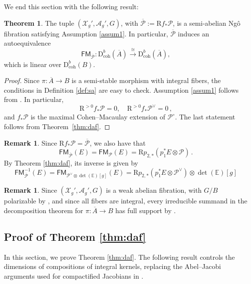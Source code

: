\documentclass[11pt]{article}
\def\P{\mathcal{P}}
\def\dbcoh{\mathrm{D}^b_{\mathrm{coh}}}
\def\Pbar{\overline{\mathcal{P}}}
\def\FM{\mathsf{FM}}
\newcommand{\barA}{\overline{A}}
\theoremstyle{definition}
\newtheorem{theorem}[definition]{Theorem}
\newtheorem{remark}[definition]{Remark}
\begin{document}
We end this section with the following result:

\begin{theorem}\label{thm:deq}
    The tuple $(\mathcal{X}_g',\mathcal{A}_g',G)$, with
    $\Pbar := \mathrm{R}f_*\P$, is a semi-abelian Ng\^o fibration satisfying Assumption
    \ref{assum1}. In particular, $\Pbar$ induces an autoequivalence
    \[
    \FM_{\Pbar} : \dbcoh(\barA) \xrightarrow{\cong} \dbcoh(\barA),
    \]
    which is linear over $\dbcoh(B)$.
\end{theorem}

\begin{proof}
    Since $\pi : \barA \to B$ is a semi-stable morphism with integral fibers,
    the conditions in Definition \ref{def:sa} are easy to check. Assumption
    \ref{assum1} follows from \cite[Section 9.5]{BMP}. In particular,
    \[
    \mathrm{R}^{>0} f_*\P = 0, \quad \mathrm{R}^{>0} f_*\P^\vee = 0\,,
    \]
    and $f_*\P$ is the maximal Cohen--Macaulay extension of $\P^\circ$.
    The last statement follows from Theorem~\ref{thm:daf}.
\end{proof}

\begin{remark}\label{rmk:DbFinv}
    Since $\mathrm{R}f_* \mathcal P = \Pbar$, we also have that
    $$
    \FM_{\Pbar}(E) = \FM_{\mathcal P}(E) = \mathrm{R}p_{2,*} (p_1^* E \otimes \P)\,.
    $$
    By Theorem \ref{thm:daf}, its inverse is given by
    $$
    \FM_{\Pbar}^{-1}(E) = \FM_{\P^{\vee} \otimes \det(\mathbb E)[g]}(E) = \mathrm{R}p_{2,*}(p_1^* E \otimes \mathcal P^{\vee})\otimes \det(\mathbb E)[g]
    $$
\end{remark}

\begin{remark}\label{rmk:full}
    Since $(\mathcal{X}_g',\mathcal{A}_g',G)$ is a weak abelian fibration, with $G/B$ polarizable by \cite{AD}, and since all fibers are integral, every irreducible summand in the decomposition theorem \cite{BBDG} for $\pi : \barA \to B$ has full support by \cite[Th\'eor\`eme 7.2.1]{Ngo}.
\end{remark}

\subsection{Proof of Theorem \ref{thm:daf}}

In this section, we prove Theorem \ref{thm:daf}. The following result controls the dimensions of compositions of integral kernels, replacing the Abel--Jacobi arguments used for compactified Jacobians in \cite{Arinkin1,Arinkin2}.
\end{document}
